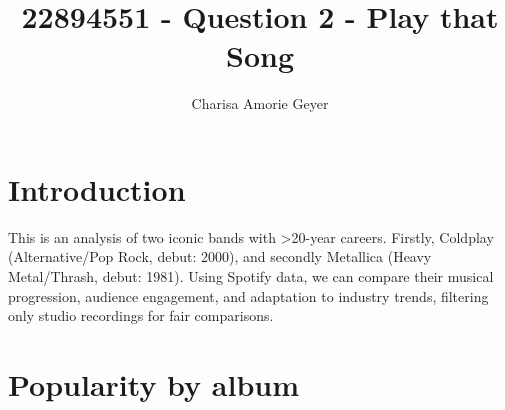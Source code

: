 \documentclass[11pt,preprint]{elsarticle}
\numberwithin{equation}{section}
\numberwithin{figure}{section}
\numberwithin{table}{section}
\begin{document}
\begin{frontmatter}  %

\title{22894551 - Question 2 - Play that Song}





\author[Add1]{Charisa Amorie Geyer}





\address[Add1]{Stellenbosch University, Cape Town, South Africa}



\vspace{1cm}





\vspace{0.5cm}

\end{frontmatter}

\setcounter{footnote}{0}



\pagestyle{fancy}
\chead{}
\rhead{}
\lfoot{}
\lhead{}
\cfoot{}


\headsep 35pt %




\section{Introduction}\label{introduction}

This is an analysis of two iconic bands with \textgreater20-year
careers. Firstly, Coldplay (Alternative/Pop Rock, debut: 2000), and
secondly Metallica (Heavy Metal/Thrash, debut: 1981). Using Spotify
data, we can compare their musical progression, audience engagement, and
adaptation to industry trends, filtering only studio recordings for fair
comparisons.

\newpage

\section{Popularity by album}\label{popularity-by-album}
\end{document}

